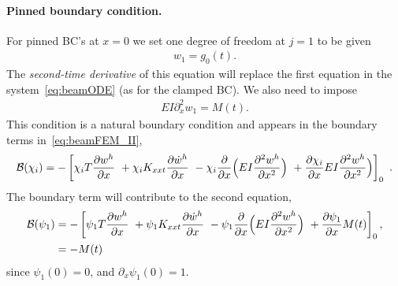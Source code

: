\documentclass[11pt]{article}
\begin{document}
\paragraph{Pinned boundary condition.} For pinned BC's at $x=0$ we set one degree of
freedom at $j=1$ to be given
\begin{align}
  w_1 = g_0(t) .
\end{align}
The {\em second-time derivative} of this equation will replace the first equation in the system~\eqref{eq:beamODE} (as for
the clamped BC).  
We also need to impose
\begin{align}
  EI \partial_x^2 w_1 = M(t). 
\end{align}
This condition is a natural boundary condition and appears in the boundary terms in~\eqref{eq:beamFEM_II}, 
\begin{align}
   \mathcal{B}(\chi_i) = -\left[ \chi_i T \frac{\partial w^h}{\partial x} 
                     ~ + \chi_i K_{xxt} \frac{\partial \dot w^h}{\partial x}
                     ~ - \chi_i \frac{\partial}{\partial x}\Big( E I \frac{\partial^2 w^h}{\partial x^2}\Big) 
                      ~ + \frac{\partial \chi_i}{\partial x}E I \frac{\partial^2 w^h}{\partial x^2}\Big)  
                      \right]_0 ~.
\end{align}
The boundary term will contribute to the second equation, 
\begin{align}
   \mathcal{B}(\psi_1) &= -\left[ \psi_1 T \frac{\partial w^h}{\partial x} 
                      ~ + \psi_1 K_{xxt} \frac{\partial \dot w^h}{\partial x}
                      ~ - \psi_1 \frac{\partial}{\partial x}\Big( E I \frac{\partial^2 w^h}{\partial x^2}\Big) 
                      ~ + \frac{\partial \psi_1}{\partial x} M(t)  
                      \right]_0, \\
        &= -M(t) 
\end{align}
since $\psi_1(0)=0$, and $\partial_x\psi_1(0)=1$. 

\end{document}
